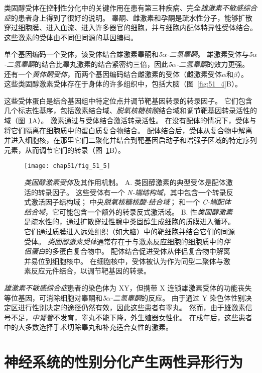 类固醇受体在控制性分化中的关键作用在患有第三种疾病、完全\textit{雄激素不敏感综合症}的患者身上得到了很好的说明。
睾酮、雌激素和孕酮是疏水性分子，能够扩散穿过细胞膜、进入血流、进入许多器官的细胞，并与细胞内配体特异性受体结合。
这些激素的受体由不同但同源的基因编码。


单个基因编码一个受体，该受体结合雄激素睾酮和\textit{5$\alpha$-二氢睾酮}。
雄激素受体与\textit{5$\alpha$-二氢睾酮}的结合比睾丸激素的结合紧密约三倍，因此\textit{5$\alpha$-二氢睾酮}的效力更强。
还有一个\textit{黄体酮受体}，而两个基因编码结合雌激素的受体（雌激素受体$\alpha$和$\beta$）。
这些类固醇激素受体存在于身体的许多组织中，包括大脑（图~\ref{fig:51_4}B）。


这些受体蛋白是结合基因组中特定位点并调节靶基因转录的转录因子。
它们包含几个标志性基序，包括激素结合域、\textit{脱氧核糖核酸}结合域和调节靶基因转录活性的域（图~\ref{fig:51_5}A）。
激素通过与受体结合激活转录活性。
在没有配体的情况下，受体与将它们隔离在细胞质中的蛋白质复合物结合。
配体结合后，受体从复合物中解离并进入细胞核，在那里它们二聚化并结合到靶基因启动子和增强子区域的特定序列元素，从而调节它们的转录（图~\ref{fig:51_5}B）。


\begin{figure}[htbp]
	\centering
	\texttt{[image: chap51/fig\_51\_5]}
	\caption{\textit{类固醇激素受体}及其作用机制。
		A. 类固醇激素的典型受体是配体激活的转录因子。
		这些受体有一个 \textit{N-端结构域}，其中包含一个转录反式激活因子结构域；
		中央\textit{脱氧核糖核酸-结合域}；
		和一个 \textit{C-端配体结合域}，它可能包含一个额外的转录反式激活域。
		B. 性\textit{类固醇激素}是疏水性的，通过扩散穿过性腺中类固醇生成细胞的质膜进入循环。
		它们通过质膜进入远处组织（如大脑）中的靶细胞并结合它们的同源受体。
		\textit{类固醇激素受体}通常存在于与激素反应细胞的细胞质中的\textit{伴侣蛋白}的多蛋白复合物中。
		配体结合促进受体从伴侣复合物中解离并易位到细胞核中。
		在细胞核中，受体被认为作为同型二聚体与激素反应元件结合，以调节靶基因的转录\cite{wierman2007sex}。}
	\label{fig:51_5}
\end{figure}


\textit{雄激素不敏感综合症}患者的染色体为 XY，但携带 X 连锁雄激素受体的功能丧失等位基因，可消除细胞对睾酮和\textit{5$\alpha$-二氢睾酮}的反应。
由于通过 Y 染色体性别决定区进行性别决定的途径仍然有效，因此这些患者有睾丸。
然而，由于雄激素信号不足，\textit{中肾管}不发育，睾丸不能下降，外生殖器女性化。
在成年后，这些患者中的大多数选择手术切除睾丸和补充适合女性的激素。



\section{神经系统的性别分化产生两性异形行为}


